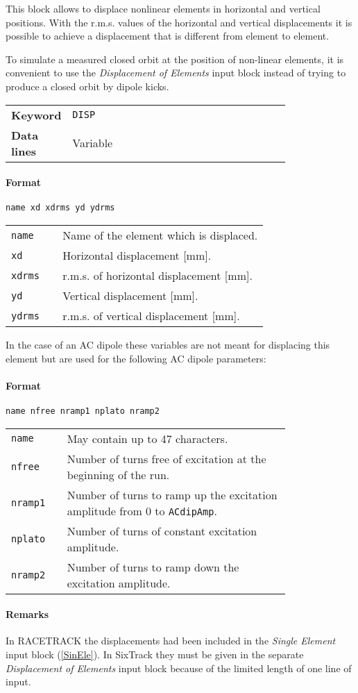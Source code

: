 This block allows to displace nonlinear elements in horizontal and vertical positions.
With the r.m.s. values of the horizontal and vertical displacements it is possible to achieve a displacement that is different from element to element.

To simulate a measured closed orbit at the position of non-linear elements, it is convenient to use the \textit{Displacement of Elements} input block instead of trying to produce a closed orbit by dipole kicks.

\bigskip
\begin{tabular}{@{}lp{0.80\linewidth}}
    \textbf{Keyword} & \texttt{DISP} \\
    \textbf{Data lines} & Variable
\end{tabular}

\paragraph{Format} \texttt{name xd xdrms yd ydrms}

\bigskip
\begin{tabular}{@{}lp{0.80\linewidth}}
    \texttt{name}  & Name of the element which is displaced. \\
    \texttt{xd}    & Horizontal displacement [mm]. \\
    \texttt{xdrms} & r.m.s. of horizontal displacement [mm]. \\
    \texttt{yd}    & Vertical displacement [mm]. \\
    \texttt{ydrms} & r.m.s. of vertical displacement [mm].
\end{tabular}

\bigskip
\noindent In the case of an AC dipole these variables are not meant for displacing this element but are used for the following AC dipole parameters:

\paragraph{Format} \texttt{name nfree nramp1 nplato nramp2}

\bigskip
\begin{tabular}{@{}lp{0.80\linewidth}}
    \texttt{name}   & May contain up to 47 characters. \\
    \texttt{nfree}  & Number of turns free of excitation at the beginning of the run. \\
    \texttt{nramp1} & Number of turns to ramp up the excitation amplitude from 0 to \texttt{ACdipAmp}. \\
    \texttt{nplato} & Number of turns of constant excitation amplitude. \\
    \texttt{nramp2} & Number of turns to ramp down the excitation amplitude.
\end{tabular}

\paragraph{Remarks}
In RACETRACK the displacements had been included in the \textit{Single Element} input block (\ref{SinEle}).
In SixTrack they must be given in the separate \textit{Displacement of Elements} input block because of the limited length of one line of input.

